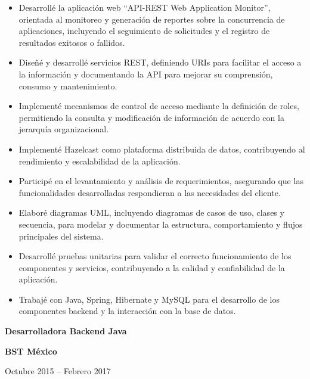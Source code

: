 \documentclass[10pt,letterpaper]{article}
\newcommand{\jobtitle}[1]{
    {\bfseries #1}
}
\newcommand{\company}[1]{
    {\bfseries\color{DarkGray} #1}
}
\newcommand{\jobdate}[1]{
    {\color{MediumGray} #1}
}
\begin{document}
\begin{itemize}

\item Desarrollé la aplicación web ``API-REST Web Application Monitor'', orientada al monitoreo y generación de reportes sobre la concurrencia de aplicaciones, incluyendo el seguimiento de solicitudes y el registro de resultados exitosos o fallidos.

\item Diseñé y desarrollé servicios REST, definiendo URIs para facilitar el acceso a la información y documentando la API para mejorar su comprensión, consumo y mantenimiento.

\item Implementé mecanismos de control de acceso mediante la definición de roles, permitiendo la consulta y modificación de información de acuerdo con la jerarquía organizacional.

\item Implementé Hazelcast como plataforma distribuida de datos, contribuyendo al rendimiento y escalabilidad de la aplicación.

\item Participé en el levantamiento y análisis de requerimientos, asegurando que las funcionalidades desarrolladas respondieran a las necesidades del cliente.

\item Elaboré diagramas UML, incluyendo diagramas de casos de uso, clases y secuencia, para modelar y documentar la estructura, comportamiento y flujos principales del sistema.

\item Desarrollé pruebas unitarias para validar el correcto funcionamiento de los componentes y servicios, contribuyendo a la calidad y confiabilidad de la aplicación.

\item Trabajé con Java, Spring, Hibernate y MySQL para el desarrollo de los componentes backend y la interacción con la base de datos.

\end{itemize}

\jobtitle{Desarrolladora Backend Java} \textbar{}
\company{BST México}
\hfill \textbar{}
\jobdate{Octubre 2015 -- Febrero 2017}
\end{document}
